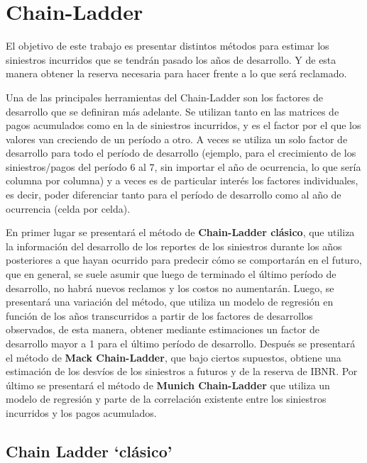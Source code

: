 \documentclass[
  12pt,
]{article}
\begin{document}
\hypertarget{chain-ladder}{%
\section{Chain-Ladder}\label{chain-ladder}}

El objetivo de este trabajo es presentar distintos métodos para estimar
los siniestros incurridos que se tendrán pasado los años de desarrollo.
Y de esta manera obtener la reserva necesaria para hacer frente a lo que
será reclamado.

Una de las principales herramientas del Chain-Ladder son los factores de
desarrollo que se definiran más adelante. Se utilizan tanto en las
matrices de pagos acumulados como en la de siniestros incurridos, y es
el factor por el que los valores van creciendo de un período a otro. A
veces se utiliza un solo factor de desarrollo para todo el período de
desarrollo (ejemplo, para el crecimiento de los siniestros/pagos del
período 6 al 7, sin importar el año de ocurrencia, lo que sería columna
por columna) y a veces es de particular interés los factores
individuales, es decir, poder diferenciar tanto para el período de
desarrollo como al año de ocurrencia (celda por celda).

En primer lugar se presentará el método de \textbf{Chain-Ladder
clásico}, que utiliza la información del desarrollo de los reportes de
los siniestros durante los años posteriores a que hayan ocurrido para
predecir cómo se comportarán en el futuro, que en general, se suele
asumir que luego de terminado el último período de desarrollo, no habrá
nuevos reclamos y los costos no aumentarán. Luego, se presentará una
variación del método, que utiliza un modelo de regresión en función de
los años transcurridos a partir de los factores de desarrollos
observados, de esta manera, obtener mediante estimaciones un factor de
desarrollo mayor a 1 para el último período de desarrollo. Después se
presentará el método de \textbf{Mack Chain-Ladder}, que bajo ciertos
supuestos, obtiene una estimación de los desvíos de los siniestros a
futuros y de la reserva de IBNR. Por último se presentará el método de
\textbf{Munich Chain-Ladder} que utiliza un modelo de regresión y parte
de la correlación existente entre los siniestros incurridos y los pagos
acumulados.

\hypertarget{chain-ladder-cluxe1sico}{%
\subsection{Chain Ladder `clásico'}\label{chain-ladder-cluxe1sico}}
\end{document}
